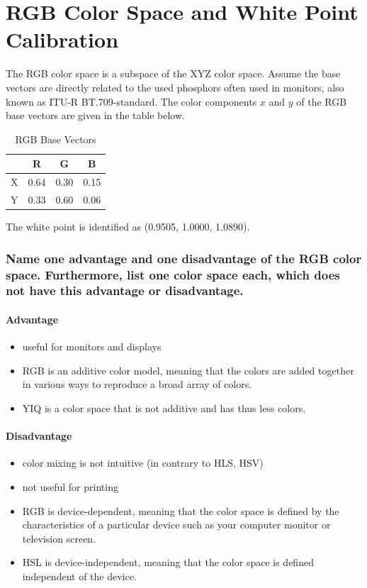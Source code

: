 \documentclass{article}
\begin{document}
\section{RGB Color Space and White Point Calibration
 }

The RGB color space is a subspace of the XYZ color space. Assume the base
vectors are directly related to the used phosphors often used in monitors, also
known as ITU-R BT.709-standard. The color components \(x\) and \(y\) of the RGB
base vectors are given in the table below.

\begin{table}[h]
    \centering
    \begin{tabular}{c|c|c|c}
          & R    & G    & B    \\ %
        \hline
        X & 0.64 & 0.30 & 0.15 \\
        \hline
        Y & 0.33 & 0.60 & 0.06 \\
    \end{tabular}
    \caption{RGB Base Vectors}
\end{table}

The white point is identified as (0.9505, 1.0000, 1.0890).

\subsubsection*{Name one advantage and one disadvantage of the RGB color space. Furthermore, list one color space each, which does not have this advantage or
    disadvantage.}

\paragraph*{Advantage}
\begin{itemize}
    \item useful for monitors and displays
    \item RGB is an additive color model, meaning that the colors are added together in various ways to reproduce a broad array of colors.
    \item YIQ is a color space that is not additive and has thus less colors.
\end{itemize}

\paragraph*{Disadvantage}
\begin{itemize}
    \item color mixing is not intuitive (in contrary to HLS, HSV)
    \item not useful for printing
    \item RGB is device-dependent, meaning that the color space is defined by the characteristics of a particular device such as your computer monitor or television screen.
    \item HSL is device-independent, meaning that the color space is defined independent of the device.
\end{itemize}
\end{document}
